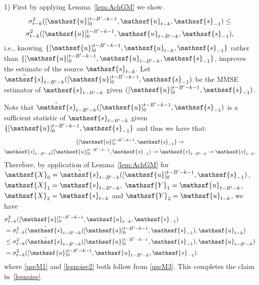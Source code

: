 \documentclass[journal, twocolumn, 10pt]{IEEEtran}
\newcommand{\rvX}{{\mathssf{X}}}    %
\newcommand{\rvY}{{\mathssf{Y}}}    %
\newcommand{\rvs}{{\mathssf{s}}}    %
\newcommand{\rvu}{{\mathssf{u}}}    %
\begin{document}
{1) First by applying Lemma~\ref{lem:AchGM} we show.
\begin{multline}\sigma^{2}_{{t-k}}([\rvu]_{0}^{t-B'-k-1},\rvu_{t-k}, \rvs_{-1}) \le \\ \sigma^{2}_{{t-k}}([\rvu]_{0}^{t-B'-k-1},\rvu_{t-B'-k}, \rvs_{-1}),
 \label{lesnoise}
\end{multline}
i.e., knowing $\{[\rvu]_{0}^{t-B'-k-1},\rvu_{t-k}, \rvs_{-1} \}$ rather than 
$\{[\rvu]_{0}^{t-B'-k-1},\rvu_{t-B'-k}, \rvs_{-1}\}$,  improves the estimate of the source $\rvs_{t-k}$.
Let $\hat{\rvs}_{t-B'-k}([\rvu]_{0}^{t-B'-k-1}, \rvs_{-1})$ be the MMSE estimator of ${\rvs}_{t-B'-k}$ given $([\rvu]_{0}^{t-B'-k-1}, \rvs_{-1})$. 

Note that $\hat{\rvs}_{t-B'-k}([\rvu]_{0}^{t-B'-k-1}, \rvs_{-1})$ is a sufficient statistic of $\rvs_{t-B'-k}$ given $\{[\rvu]_{0}^{t-B'-k-1}, \rvs_{-1}\}$ and thus we have that:
\begin{multline}
\{[\rvu]_{0}^{t-B'-k-1}, \rvs_{-1}\} \rightarrow \\ \hat{\rvs}_{t-B'-k}([\rvu]_{0}^{t-B'-k-1}, \rvs_{-1})  \rightarrow {\rvs}_{t-B'-k}  \rightarrow {\rvs}_{t-k}. \label{useM3}
\end{multline}  
Therefore, by application of Lemma~\ref{lem:AchGM} for $\rvX_0 = \hat{\rvs}_{t-B'-k}([\rvu]_{0}^{t-B'-k-1}, \rvs_{-1})$, $\rvX_1 = \rvs_{t-B'-k}$, $\rvY_1 = \rvu_{t-B'-k}$, $\rvX_2 = \rvs_{t-k}$ and $\rvY_2 = \rvu_{t-k}$, we have 
\begin{align}
&\sigma^{2}_{{t-k}}([\rvu]_{0}^{t-B'-k-1},\rvu_{t-k}, \rvs_{-1})\notag\\
& = \sigma^{2}_{{t-k}}(\hat{\rvs}_{t-B'-k}([\rvu]_{0}^{t-B'-k-1}, \rvs_{-1}), \rvu_{t-k} ) \label{useM1}\\
& \le  \sigma^{2}_{{t-k}}(\hat{\rvs}_{t-B'-k}([\rvu]_{0}^{t-B'-k-1}, \rvs_{-1}), \rvu_{t-B'-k} )\label{useM2}\\
& = \sigma^{2}_{{t-k}}([\rvu]_{0}^{t-B'-k-1},\rvu_{t-B'-k}, \rvs_{-1}). \label{lesnoise2}
\end{align} where \eqref{useM1} and \eqref{lesnoise2} both follow from \eqref{useM3}. 
This completes the claim in~\eqref{lesnoise}.

}
\end{document}
